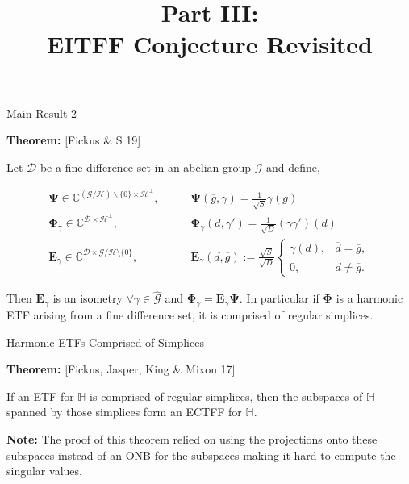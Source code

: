 \documentclass[12pt]{beamer}
\newcommand{\bbC}{\mathbb{C}}
\newcommand{\bbH}{\mathbb{H}}
\newcommand{\bfE}{\mathbf{E}}
\newcommand{\bfPhi}{\boldsymbol{\Phi}}
\newcommand{\bfPsi}{\boldsymbol{\Psi}}
\newcommand{\calD}{\mathcal{D}}
\newcommand{\calG}{\mathcal{G}}
\newcommand{\calH}{\mathcal{H}}
\begin{document}
\begin{frame}{Main Result 2}

\textbf{Theorem:} [Fickus \& S 19]\\\smallskip

Let $\calD$ be a fine difference set in an abelian group $\calG$ and define,

\begin{align*}
	\bfPsi\in\bbC^{(\calG/\calH)\backslash\{\overline{0}\}\times\calH^\perp},&\qquad \bfPsi(\overline{g},\gamma)=\tfrac{1}{\sqrt{S}}\gamma(g)\\
	\bfPhi_\gamma\in\bbC^{\calD\times\calH^\perp},& \qquad \bfPhi_\gamma(d,\gamma')=\tfrac{1}{\sqrt{D}}(\gamma\gamma')(d)\\
	\bfE_\gamma\in\bbC^{\calD\times\calG/\calH\setminus\{\overline{0}\}},& \qquad \bfE_\gamma(d,\overline{g}):=\tfrac{\sqrt{S}}{\sqrt{D}}\left\{\begin{array}{cc}
	\gamma(d), & \overline{d}=\overline{g}, \\
	0, & \overline{d}\not=\overline{g}.
	\end{array}\right.
\end{align*}

Then $\bfE_{\gamma}$ is an isometry $\forall \gamma\in\hat{\calG}$ and $\bfPhi_{\gamma}=\bfE_{\gamma}\bfPsi$.
In particular if $\bfPhi$ is a harmonic ETF arising from a fine difference set, it is comprised of regular simplices.

\end{frame}

\begin{frame}[noframenumbering]
\title{Part III:\\
EITFF Conjecture Revisited}
\author{}
\institute{}

\date{}
\titlegraphic{}
\maketitle

\end{frame}

\begin{frame}{Harmonic ETFs Comprised of Simplices}

\textbf{Theorem:}
[Fickus, Jasper, King \& Mixon 17]\smallskip

If an ETF for $\bbH$ is comprised of regular simplices, then the subspaces of $\bbH$ spanned by those simplices form an ECTFF for $\bbH$.

\vfill 

\textbf{Note:} The proof of this theorem relied on using the projections onto these subspaces instead of an ONB for the subspaces making it hard to compute the singular values.

\end{frame}
\end{document}
